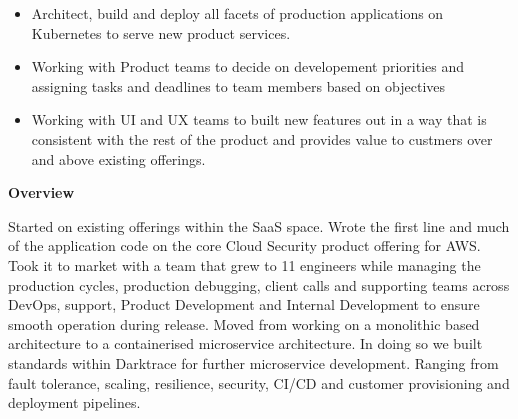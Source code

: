 \documentclass[10pt,a4paper]{altacv}
\begin{document}
\begin{itemize}
  \item Architect, build and deploy all facets of production applications on Kubernetes to serve new product services.
\end{itemize}
\begin{itemize}
  \item Working with Product teams to decide on developement priorities and assigning tasks and deadlines to team members based on objectives
\end{itemize}
\begin{itemize}
  \item Working with UI and UX teams to built new features out in a way that is consistent with the rest of the product and provides value to custmers over and above existing offerings.
\end{itemize}

\divider


\textbf{Overview}

Started on existing offerings within the SaaS space. Wrote the first line and much of the application code on the core Cloud Security product offering for AWS. Took it to market with a team that grew to 11 engineers while managing the production cycles, production debugging, client calls and supporting teams across DevOps, support, Product Development and Internal Development to ensure smooth operation during release.
\newline
\newline
Moved from working on a monolithic based architecture to a containerised microservice architecture. In doing so we built standards within Darktrace for further microservice development. Ranging from fault tolerance, scaling, resilience, security, CI/CD and customer provisioning and deployment pipelines.
\divider
\end{document}
